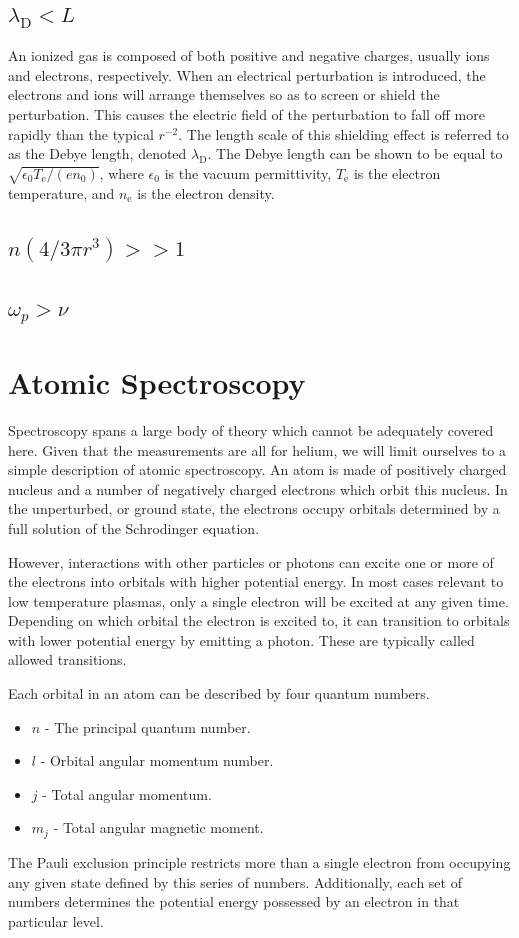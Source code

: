 \subsection{$\lambda_\mathrm{D} < L$}
An ionized gas is composed of both positive and negative charges,
usually ions and electrons, respectively. When an electrical
perturbation is introduced, the electrons and ions will arrange
themselves so as to screen or shield the perturbation. This causes the
electric field of the perturbation to fall off more rapidly than the
typical $r^{-2}$. The length scale of this shielding effect is referred
to as the Debye length, denoted $\lambda_\mathrm{D}$. The Debye length
can be shown to be equal to $\sqrt{\epsilon_0T_\mathrm{e}/(en_0)}$,
where $\epsilon_0$ is the vacuum permittivity, $T_\mathrm{e}$ is the
electron temperature, and $n_\mathrm{e}$ is the electron density.

\subsection{$n(4/3\pi r^3) >> 1$}
\subsection{$\omega_p > \nu$}

\section{Atomic Spectroscopy}

Spectroscopy spans a large body of theory which cannot be adequately
covered here. Given that the measurements are all for helium, we will
limit ourselves to a simple description of atomic spectroscopy. An atom
is made of positively charged nucleus and a number of negatively charged
electrons which orbit this nucleus. In the unperturbed, or ground state,
the electrons occupy orbitals determined by a full solution of the
Schrodinger equation.

However, interactions with other particles or photons can excite one or
more of the electrons into orbitals with higher potential energy. In
most cases relevant to low temperature plasmas, only a single electron
will be excited at any given time. Depending on which orbital the
electron is excited to, it can transition to orbitals with lower
potential energy by emitting a photon. These are typically called
allowed transitions.

Each orbital in an atom can be described by four quantum numbers.
\begin{itemize}
  \item $n$ - The principal quantum number.
  \item $l$ - Orbital angular momentum number.
  \item $j$ - Total angular momentum.
  \item $m_j$ - Total angular magnetic moment.
\end{itemize}
The Pauli exclusion principle restricts more than a single electron from
occupying any given state defined by this series of numbers.
Additionally, each set of numbers determines the potential energy
possessed by an electron in that particular level. 

